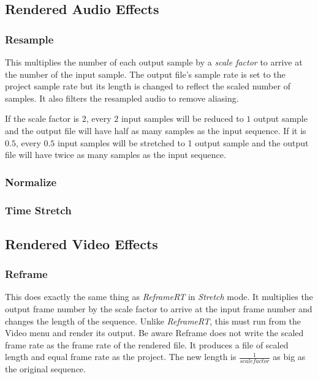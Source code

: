 \subsection{Rendered Audio Effects}%
\label{sub:renederd_audio_effets}

\subsubsection*{Resample}%
\label{ssub:resample}

This multiplies the number of each output sample by a \textit{scale factor} to arrive at the number of the input sample. The output file's sample rate is set to the project sample rate but its length is changed to reflect the scaled number of samples. It also filters the resampled audio to remove aliasing.

If the scale factor is $2$, every $2$ input samples will be reduced to $1$ output sample and the output file will have half as many samples as the input sequence. If it is $0.5$, every $0.5$ input samples will be stretched to 1 output sample and the output file will have twice as many samples as the input sequence.

\subsubsection*{Normalize}%
\label{ssub:normalize}

\subsubsection*{Time Stretch}%
\label{ssub:time_stretch}

\subsection{Rendered Video Effects}%
\label{sub:renederd_video_effets}

\subsubsection*{Reframe}%
\label{ssub:reframe}

This does exactly the same thing as \textit{ReframeRT} in \textit{Stretch} mode. It multiplies the output frame number by the scale factor to arrive at the input frame number and changes the length of the sequence. Unlike \textit{ReframeRT}, this must run from the Video menu and render its output. Be aware Reframe does not write the scaled frame rate as the frame rate of the rendered file. It produces a file of scaled length and equal frame rate as the project. The new length is $\frac{1}{scale factor}$ as big as the original sequence.

